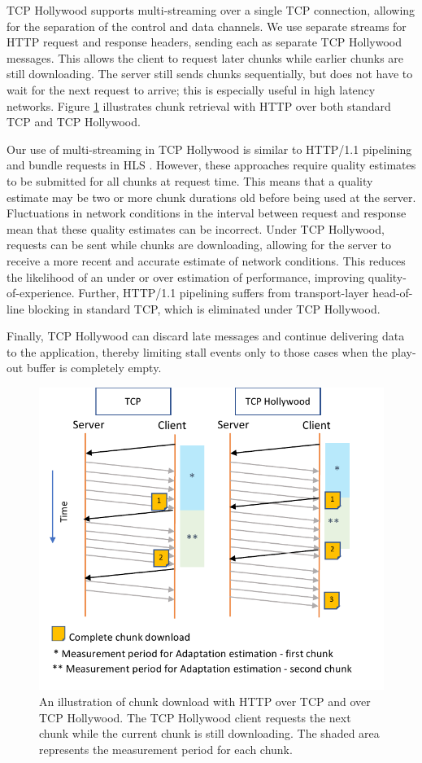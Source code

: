 TCP Hollywood supports multi-streaming over a single TCP connection, allowing for the
separation of the control and data channels. We use separate streams for HTTP request and
response headers, sending each as separate TCP Hollywood messages. This allows the client
to request later chunks while earlier chunks are still downloading. The server still sends
chunks sequentially, but does not have to wait for the next request to arrive; this is
especially useful in high latency networks. Figure \ref{fig:hollywood_download}
illustrates chunk retrieval with HTTP over both standard TCP and TCP Hollywood.

Our use of multi-streaming in TCP Hollywood is similar to HTTP/1.1 pipelining and bundle
requests in HLS \cite{muller2012evaluation}. However, these approaches require quality
estimates to be submitted for all chunks at request time. This means that a quality
estimate may be two or more chunk durations old before being used at the server.
Fluctuations in network conditions in the interval between request and response mean that
these quality estimates can be incorrect. Under TCP Hollywood, requests can be sent while
chunks are downloading, allowing for the server to receive a more recent and accurate
estimate of network conditions. This reduces the likelihood of an under or over estimation
of performance, improving quality-of-experience. Further, HTTP/1.1 pipelining suffers
from transport-layer head-of-line blocking in standard TCP, which is eliminated under TCP Hollywood.

Finally, TCP Hollywood can discard late messages and continue delivering data to the application, thereby limiting stall events only to those cases when the play-out buffer is completely
empty.

\begin{figure}
    \centering
    \includegraphics[width=\columnwidth]{figures/tcph-download.pdf}
    \caption{An illustration of chunk download with HTTP over TCP and over TCP Hollywood. The TCP Hollywood client requests the next chunk while the current chunk is still downloading. The shaded area represents the measurement period for each chunk. }
    \label{fig:hollywood_download}
\end{figure}

